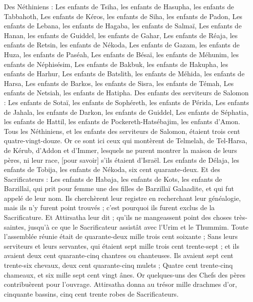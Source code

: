 \begin{multicols}{2}
{Des Néthiniens : Les enfants de Tsiha, les enfants de Hasupha, les enfants de Tabbahoth,
Les enfants de Kéros, les enfants de Siha, les enfants de Padon,
Les enfants de Lebana, les enfants de Hagaba, les enfants de Salmaï,
Les enfants de Hanan, les enfants de Guiddel, les enfants de Gahar,
Les enfants de Réaja, les enfants de Retsin, les enfants de Nékoda,
Les enfants de Gazam, les enfants de Huza, les enfants de Paséah,
Les enfants de Bésaï, les enfants de Méhunim, les enfants de Néphisésim,
Les enfants de Bakbuk, les enfants de Hakupha, les enfants de Harhur,
Les enfants de Batslith, les enfants de Méhida, les enfants de Harsa,
Les enfants de Barkos, les enfants de Sisra, les enfants de Témah,
Les enfants de Netsiah, les enfants de Hatipha.
Des enfants des serviteurs de Salomon : Les enfants de Sotaï, les enfants de Sophéreth, les enfants de Périda,
Les enfants de Jahala, les enfants de Darkon, les enfants de Guiddel,
Les enfants de Séphatia, les enfants de Hattil, les enfants de Pockereth-Hatsébajim, les enfants d'Amon.
Tous les Néthiniens, et les enfants des serviteurs de Salomon, étaient trois cent quatre-vingt-douze.
Or ce sont ici ceux qui montèrent de Telmelah, de Tel-Harsa, de Kérub, d'Addon et d'Immer, lesquels ne purent montrer la maison de leurs pères, ni leur race, [pour savoir] s'ils étaient d'Israël.
Les enfants de Délaja, les enfants de Tobija, les enfants de Nékoda, six cent quarante-deux.
Et des Sacrificateurs : Les enfants de Habaja, les enfants de Kots, les enfants de Barzillaï, qui prit pour femme une des filles de Barzillaï Galaadite, et qui fut appelé de leur nom.
Ils cherchèrent leur registre en recherchant leur généalogie, mais ils n'y furent point trouvés ; c'est pourquoi ils furent exclus de la Sacrificature.
Et Attirsatha leur dit ; qu'ils ne mangeassent point des choses très-saintes, jusqu'à ce que le Sacrificateur assistât avec l'Urim et le Thummim.
Toute l'assemblée réunie était de quarante-deux mille trois cent soixante ;
Sans leurs serviteurs et leurs servantes, qui étaient sept mille trois cent trente-sept ; et ils avaient deux cent quarante-cinq chantres ou chanteuses.
Ils avaient sept cent trente-six chevaux, deux cent quarante-cinq mulets ;
Quatre cent trente-cinq chameaux, et six mille sept cent vingt ânes.
Or quelques-uns des Chefs des pères contribuèrent pour l'ouvrage. Attirsatha donna au trésor mille drachmes d'or, cinquante bassins, cinq cent trente robes de Sacrificateurs.
}
\end{multicols}
